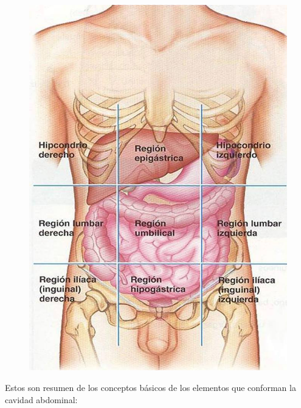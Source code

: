 \begin{figure}[H]
	\begin{center}
 		\includegraphics[width = .3\textwidth]{v3/images/image1.jpg}
	\end{center} 
\end{figure}
Estos son resumen de los conceptos básicos de los elementos que conforman la cavidad abdominal\cite{pro2012anatomia}:
